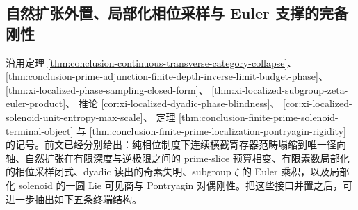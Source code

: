 \subsection{自然扩张外置、局部化相位采样与 Euler 支撑的完备刚性}\label{subsec:conclusion-naturalextension-localized-phase-zeta-solenoid-rigidity}
沿用定理 \ref{thm:conclusion-continuous-transverse-category-collapse}、
\ref{thm:conclusion-prime-adjunction-finite-depth-inverse-limit-budget-phase}、
\ref{thm:xi-localized-phase-sampling-closed-form}、
\ref{thm:xi-localized-subgroup-zeta-euler-product}、
推论 \ref{cor:xi-localized-dyadic-phase-blindness}、
\ref{cor:xi-localized-solenoid-unit-entropy-max-scale}、
定理 \ref{thm:conclusion-finite-prime-solenoid-terminal-object}
与
\ref{thm:conclusion-finite-prime-localization-pontryagin-rigidity}
的记号。前文已经分别给出：纯相位制度下连续横截寄存器范畴塌缩到唯一径向轴、自然扩张在有限深度与逆极限之间的 prime-slice 预算相变、有限素数局部化的相位采样闭式、dyadic 读出的奇素失明、subgroup \(\zeta\) 的 Euler 乘积，以及局部化 solenoid 的一圆 Lie 可见商与 Pontryagin 对偶刚性。把这些接口并置之后，可进一步抽出如下五条终端结构。

